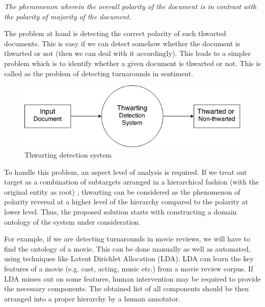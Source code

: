 \vspace{8mm}

\textit{The phenomenon wherein the overall polarity of
the document is in contrast with the polarity of
majority of the document.}

\vspace{8mm}

The problem at hand is detecting the correct polarity of such thwarted documents. This is easy if we can detect somehow whether the document is
thwarted or not (then we can deal with it accordingly). This leads to a simpler problem which is to identify whether a given document is thwarted or not. 
This is called as the problem of detecting turnarounds in sentiment.

\begin{figure}[t]
\includegraphics[scale=0.6]{gfx/flow.png}
\caption{Thwarting detection system }
\centering
\end{figure}


\vspace{8mm}

To handle this problem, an aspect level of analysis is required. If we treat out target as a combination of subtargets arranged in a hierarchical fashion (with the original entity as root)
, thwarting can be considered as the phenomenon of polarity reversal at a higher level of the hierarchy compared to the polarity at lower level. Thus, the proposed solution
starts with constructing a domain ontology of the system under consideration.

\vspace{8mm}

For example, if we are detecting turnarounds in movie reviews, we will have to find the ontology of a movie. This can be done manually as well as automated, using techniques
like Latent Dirichlet Allocation (LDA). LDA can learn the key features of a movie (e.g. cast, acting, music etc.) from a movie review corpus. If LDA misses out on some
features, human intervention may be required to provide the necessary components. The obtained list of all components should be then arranged into a proper hierarchy by a
human annotator.

